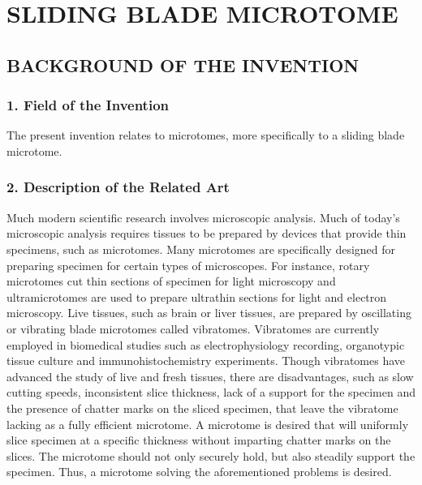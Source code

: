 \documentclass{article}
\begin{document}
\section*{SLIDING BLADE MICROTOME}

\subsection*{BACKGROUND OF THE INVENTION}

\subsubsection*{1. Field of the Invention}

The present invention relates to microtomes, more specifically to a sliding blade microtome.

\subsubsection*{2. Description of the Related Art}

Much modern scientific research involves microscopic analysis. Much of today's microscopic analysis requires tissues to be prepared by devices that provide thin specimens, such as microtomes. Many microtomes are specifically designed for preparing specimen for certain types of microscopes. For instance, rotary microtomes cut thin sections of specimen for light microscopy and ultramicrotomes are used to prepare ultrathin sections for light and electron microscopy. Live tissues, such as brain or liver tissues, are prepared by oscillating or vibrating blade microtomes called vibratomes. Vibratomes are currently employed in biomedical studies such as electrophysiology recording, organotypic tissue culture and immunohistochemistry experiments. Though vibratomes have advanced the study of live and fresh tissues, there are disadvantages, such as slow cutting speeds, inconsistent slice thickness, lack of a support for the specimen and the presence of chatter marks on the sliced specimen, that leave the vibratome lacking as a fully efficient microtome. A microtome is desired that will uniformly slice specimen at a specific thickness without imparting chatter marks on the slices. The microtome should not only securely hold, but also steadily support the specimen. Thus, a microtome solving the aforementioned problems is desired.
\end{document}
